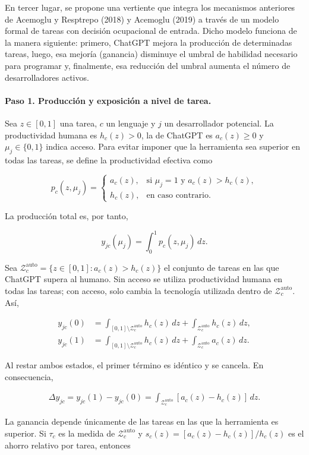 \documentclass[12pt,a4paper]{article}
\newcommand{\Zauto}{\mathcal{Z}^{\mathrm{auto}}_c}
\newcommand{\dd}{\,dz}
\begin{document}
En tercer lugar, se propone una vertiente que integra los mecanismos anteriores de Acemoglu y Resptrepo (2018) y Acemoglu (2019) a través de un modelo formal de tareas con decisión ocupacional de entrada. Dicho modelo funciona de la manera siguiente: primero, ChatGPT mejora la producción de determinadas tareas, luego, esa mejoría (ganancia) disminuye el umbral de habilidad necesario para programar y, finalmente, esa reducción del umbral aumenta el número de desarrolladores activos.

\paragraph{Paso 1. Producción y exposición a nivel de tarea.} Sea $z\in[0,1]$ una tarea, $c$ un lenguaje y $j$ un desarrollador potencial. La productividad humana es $h_c(z)>0$, la de ChatGPT es $a_c(z)\geq 0$ y $\mu_j\in\{0,1\}$ indica acceso. Para evitar imponer que la herramienta sea superior en todas las tareas, se define la productividad efectiva como

\[
p_c(z,\mu_j)=
\begin{cases}
a_c(z), & \text{si } \mu_j=1 \text{ y } a_c(z)>h_c(z),\\
h_c(z), & \text{en caso contrario.}
\end{cases}
\]

La producción total es, por tanto,

\[
y_{jc}(\mu_j)=\int_0^1 p_c(z,\mu_j)\dd.
\]

Sea $\Zauto=\{z\in[0,1]:a_c(z)>h_c(z)\}$ el conjunto de tareas en las que ChatGPT supera al humano. Sin acceso se utiliza productividad humana en todas las tareas; con acceso, solo cambia la tecnología utilizada dentro de $\Zauto$. Así,

\[
\begin{aligned}
y_{jc}(0)&=\int_{[0,1]\setminus\Zauto}h_c(z)\dd+\int_{\Zauto}h_c(z)\dd,\\
y_{jc}(1)&=\int_{[0,1]\setminus\Zauto}h_c(z)\dd+\int_{\Zauto}a_c(z)\dd.
\end{aligned}
\]

Al restar ambos estados, el primer término es idéntico y se cancela. En consecuencia,

\[
\begin{aligned}
\Delta y_{jc}=y_{jc}(1)-y_{jc}(0)
=\int_{\Zauto}[a_c(z)-h_c(z)]\dd.
\end{aligned}
\]

La ganancia depende únicamente de las tareas en las que la herramienta es superior. Si $\tau_c$ es la medida de $\Zauto$ y $s_c(z)=[a_c(z)-h_c(z)]/h_c(z)$ es el ahorro relativo por tarea, entonces
\end{document}
